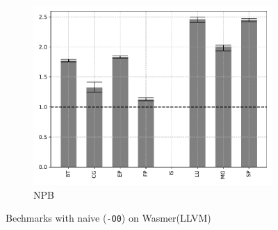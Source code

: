 \begin{figure}
\begin{subfigure}[t]{.45\textwidth}
        \includegraphics[width=\textwidth]
        {Images/6.1.RQ1/npb-wasmer-llvm-naive.pdf}
        \caption{NPB}
    \end{subfigure}
    \caption{Bechmarks with naive (\texttt{-O0}) on Wasmer(LLVM)}
    \label{fig:rq1-wasmer-llvm-naive}
\end{figure}

